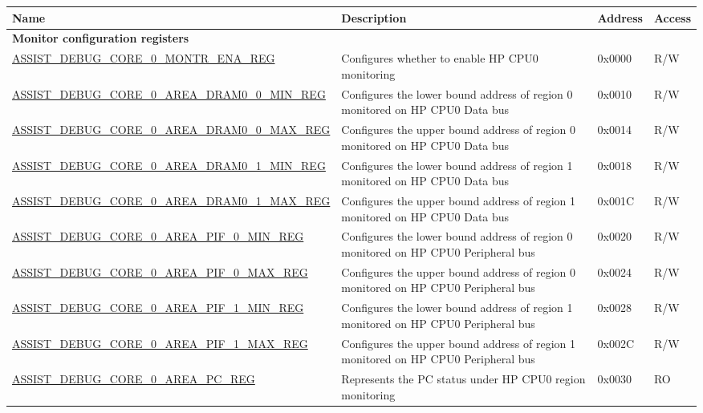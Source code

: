 \begin{longtable}{ | p{8.7cm} | m{5.3cm} | p{1.2cm} | p{1.2cm} | }
\hline\rowcolor{lightgray}
{\bfseries Name} & {\bfseries Description} &  {\bfseries Address} & {\bfseries Access} \\ \hline
\endhead
\multicolumn{4}{|l|}{\textbf{Monitor configuration registers}} \\ \hline
\hyperref[regdesc:ASSISTDEBUGCORE0MONTRENAREG]{ASSIST\_DEBUG\_CORE\_0\_MONTR\_ENA\_REG} & Configures whether to enable HP CPU0 monitoring & 0x0000 & R/W \\ \hline
\hyperref[regdesc:ASSISTDEBUGCORE0AREADRAM00MINREG]{ASSIST\_DEBUG\_CORE\_0\_AREA\_DRAM0\_0\_MIN\_REG} & Configures the lower bound address of region 0 monitored on HP CPU0 Data bus & 0x0010 & R/W \\ \hline
\hyperref[regdesc:ASSISTDEBUGCORE0AREADRAM00MAXREG]{ASSIST\_DEBUG\_CORE\_0\_AREA\_DRAM0\_0\_MAX\_REG} & Configures the upper bound address of region 0 monitored on HP CPU0 Data bus & 0x0014 & R/W \\ \hline
\hyperref[regdesc:ASSISTDEBUGCORE0AREADRAM01MINREG]{ASSIST\_DEBUG\_CORE\_0\_AREA\_DRAM0\_1\_MIN\_REG} & Configures the lower bound address of region 1 monitored on HP CPU0 Data bus & 0x0018 & R/W \\ \hline
\hyperref[regdesc:ASSISTDEBUGCORE0AREADRAM01MAXREG]{ASSIST\_DEBUG\_CORE\_0\_AREA\_DRAM0\_1\_MAX\_REG} & Configures the upper bound address of region 1 monitored on HP CPU0 Data bus & 0x001C & R/W \\ \hline
\hyperref[regdesc:ASSISTDEBUGCORE0AREAPIF0MINREG]{ASSIST\_DEBUG\_CORE\_0\_AREA\_PIF\_0\_MIN\_REG} & Configures the lower bound address of region 0 monitored on HP CPU0 Peripheral bus & 0x0020 & R/W \\ \hline
\hyperref[regdesc:ASSISTDEBUGCORE0AREAPIF0MAXREG]{ASSIST\_DEBUG\_CORE\_0\_AREA\_PIF\_0\_MAX\_REG} & Configures the upper bound address of region 0 monitored on HP CPU0 Peripheral bus & 0x0024 & R/W \\ \hline
\hyperref[regdesc:ASSISTDEBUGCORE0AREAPIF1MINREG]{ASSIST\_DEBUG\_CORE\_0\_AREA\_PIF\_1\_MIN\_REG} & Configures the lower bound address of region 1 monitored on HP CPU0 Peripheral bus & 0x0028 & R/W \\ \hline
\hyperref[regdesc:ASSISTDEBUGCORE0AREAPIF1MAXREG]{ASSIST\_DEBUG\_CORE\_0\_AREA\_PIF\_1\_MAX\_REG} & Configures the upper bound address of region 1 monitored on HP CPU0 Peripheral bus & 0x002C & R/W \\ \hline
\hyperref[regdesc:ASSISTDEBUGCORE0AREAPCREG]{ASSIST\_DEBUG\_CORE\_0\_AREA\_PC\_REG} & Represents the PC status under HP CPU0 region monitoring & 0x0030 & RO \\ \hline

\end{longtable}
